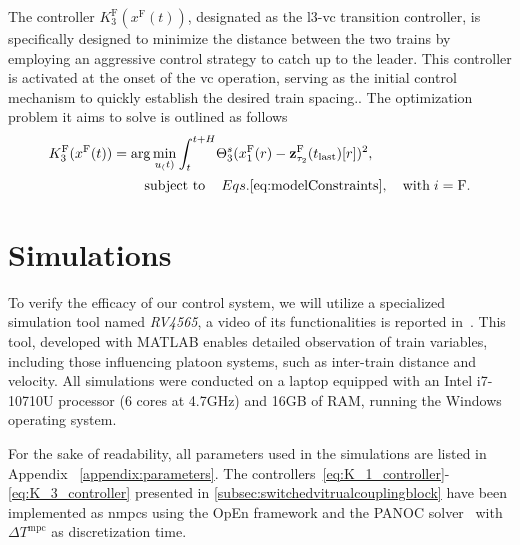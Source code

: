 \documentclass[letterpaper, 10 pt, conference]{ieeeconf}
\theoremstyle{definition}
\theoremstyle{nopoint}
\newcommand{\tildeAdd}{~}
\begin{document}
The controller $K^{\mathrm{F}}_3(x^{\mathrm{F}}(t))$, designated as the \gls{l3}-\gls{vc} transition controller, is specifically designed to minimize the distance between the two trains by employing an aggressive control strategy to catch up to the leader. This controller is activated at the onset of the \gls{vc} operation, serving as the initial control mechanism to quickly establish the desired train spacing.. The optimization problem it aims to solve is outlined as follows
%
\begin{equation}
	\label{eq:K_3_controller}
	\begin{aligned}
		K^{\mathrm{F}}_3(x^\mathrm{F}(t)) = \arg  \min_{u_(t)} \int_{t}^{t+H}& \Theta^s_3(x_1^{\mathrm{F}}(r)-\mathbf{z}_{\tau_2}^\mathrm{F}(t_{\mathrm{last}})[r])^2, \\
		&	\hspace{-1.8cm} \text{subject to} \qquad \hspace{-1cm}  \qquad Eqs.\eqref{eq:modelConstraints}, \quad \mathrm{with} \; i = \mathrm{F}.
	\end{aligned}
\end{equation}






 
\section{Simulations}
 \label{sec:Simulations}
 
  To verify the efficacy of our control system, we will utilize a specialized simulation tool named \textit{RV4565}, a video of its functionalities is reported in\tildeAdd\cite{youtubeVideo}. This tool, developed with MATLAB enables detailed observation of train variables, including those influencing platoon systems, such as inter-train distance and velocity. All simulations were conducted on a laptop equipped with an Intel i7-10710U processor (6 cores at 4.7GHz) and 16GB of RAM, running the Windows operating system.
  
  
  For the sake of readability, all parameters used in the simulations are listed in Appendix \tildeAdd\ref{appendix:parameters}.   The controllers\tildeAdd\eqref{eq:K_1_controller}-\eqref{eq:K_3_controller} presented in \ref{subsec:switchedvitrualcouplingblock} have been implemented as \glspl{nmpc} using the OpEn framework and the PANOC solver\tildeAdd\cite{open2020} with $\Delta T^{\mathrm{mpc}}$ as discretization time. 
  
\end{document}
